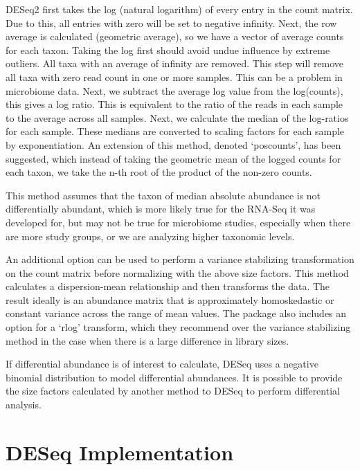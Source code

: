 \documentclass[
]{book}
\begin{document}
DESeq2 first takes the log (natural logarithm) of every entry in the count matrix. Due to this, all entries with zero will be set to negative infinity. Next, the row average is calculated (geometric average), so we have a vector of average counts for each taxon. Taking the log first should avoid undue influence by extreme outliers. All taxa with an average of infinity are removed. This step will remove all taxa with zero read count in one or more samples. This can be a problem in microbiome data.
Next, we subtract the average log value from the log(counts), this gives a log ratio. This is equivalent to the ratio of the reads in each sample to the average across all samples.
Next, we calculate the median of the log-ratios for each sample. These medians are converted to scaling factors for each sample by exponentiation.
An extension of this method, denoted `poscounts', has been suggested, which instead of taking the geometric mean of the logged counts for each taxon, we take the n-th root of the product of the non-zero counts.

This method assumes that the taxon of median absolute abundance is not differentially abundant, which is more likely true for the RNA-Seq it was developed for, but may not be true for microbiome studies, especially when there are more study groups, or we are analyzing higher taxonomic levels.

An additional option can be used to perform a variance stabilizing transformation on the count matrix before normalizing with the above size factors. This method calculates a dispersion-mean relationship and then transforms the data. The result ideally is an abundance matrix that is approximately homoskedastic or constant variance across the range of mean values. The package also includes an option for a `rlog' transform, which they recommend over the variance stabilizing method in the case when there is a large difference in library sizes.

If differential abundance is of interest to calculate, DESeq uses a negative binomial distribution to model differential abundances.
It is possible to provide the size factors calculated by another method to DESeq to perform differential analysis.

\hypertarget{deseq-implementation}{%
\section{DESeq Implementation}\label{deseq-implementation}}
\end{document}
